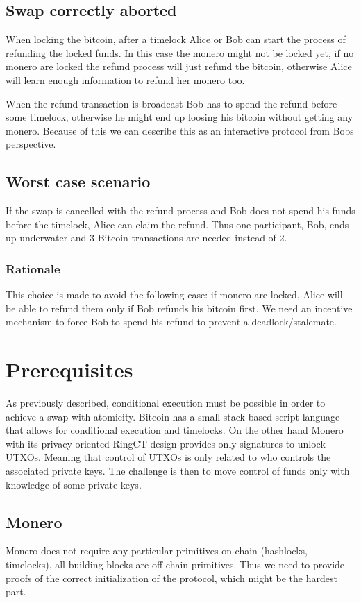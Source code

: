 \documentclass{llncs}
\begin{document}
\subsection{Swap correctly aborted}
When locking the bitcoin, after a timelock Alice or Bob can start the process of refunding the locked funds. In this case the monero might not be locked yet, if no monero are locked the refund process will just refund the bitcoin, otherwise Alice will learn enough information to refund her monero too.

When the refund transaction is broadcast Bob has to spend the refund before some timelock, otherwise he might end up loosing his bitcoin without getting any monero.  Because of this we can describe this as an interactive protocol from Bobs perspective.

\subsection{Worst case scenario}
If the swap is cancelled with the refund process and Bob does not spend his funds before the timelock, Alice can claim the refund. Thus one participant, Bob, ends up underwater and 3 Bitcoin transactions are needed instead of 2.

\subsubsection{Rationale}
\label{worstCaseRationale}
This choice is made to avoid the following case: if monero are locked, Alice will be able to refund them only if Bob refunds his bitcoin first.  We need an incentive mechanism to force Bob to spend his refund to prevent a deadlock/stalemate.

\section{Prerequisites}
As previously described, conditional execution must be possible in order to achieve a swap with atomicity. Bitcoin has a small stack-based script language that allows for conditional execution and timelocks. On the other hand Monero with its privacy oriented RingCT design provides only signatures to unlock UTXOs. Meaning that control of UTXOs is only related to who controls the associated private keys. The challenge is then to move control of funds only with knowledge of some private keys.

\subsection{Monero}
Monero does not require any particular primitives on-chain (hashlocks, timelocks), all building blocks are off-chain primitives. Thus we need to provide proofs of the correct initialization of the protocol, which might be the hardest part.
\end{document}
